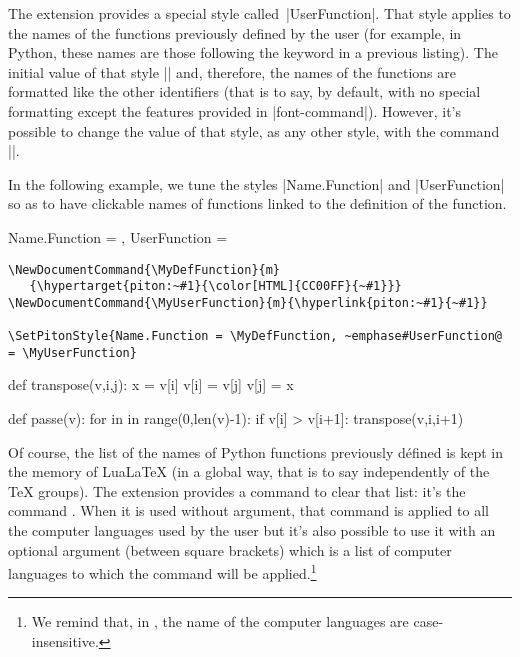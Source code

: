 \documentclass{article}
\begin{document}

The extension  provides a special style called~|UserFunction|.
That style applies to the names of the functions previously defined by the user
(for example, in Python, these names are those following the keyword 
in a previous listing). The initial value of that style ||
and, therefore, the names of the functions are formatted like the other identifiers
(that is to say, by default, with no special formatting except the features provided
in |font-command|). However, it's possible to change the value of that style, as any
other style, with the command |\SetPitonStyle|.

\medskip
In the following example, we tune the styles |Name.Function| and |UserFunction|
so as to have clickable names of functions linked to the definition of the function.

\begingroup


\SetPitonStyle
  {
    Name.Function = \MyDefFunction ,
    UserFunction = \MyUserFunction
  }

\medskip
\begin{Verbatim}
\NewDocumentCommand{\MyDefFunction}{m}
   {\hypertarget{piton:~#1}{\color[HTML]{CC00FF}{~#1}}}
\NewDocumentCommand{\MyUserFunction}{m}{\hyperlink{piton:~#1}{~#1}}

\SetPitonStyle{Name.Function = \MyDefFunction, ~emphase#UserFunction@ = \MyUserFunction}
\end{Verbatim}

\smallskip

\begin{Piton}
def transpose(v,i,j):
    x = v[i]
    v[i] = v[j]
    v[j] = x 

def passe(v):
    for in in range(0,len(v)-1):
        if v[i] > v[i+1]:
            transpose(v,i,i+1)
\end{Piton}

\endgroup


\PitonClearUserFunctions[Python]

\bigskip
\begin{small}
Of course, the list of the names of Python functions previously défined is
kept in the memory of LuaLaTeX (in a global way, that is to say independently
of the TeX groups). The extension  provides a command to clear that
list: it's the command . When it
is used without argument, that command is applied to all the computer
languages used by the user but it's also possible to use it with an optional
argument (between square brackets) which is a list of computer languages to
which the command will be applied.\footnote{We remind that, in ,
the name of the computer languages are case-insensitive.}
\end{small}
\end{document}
